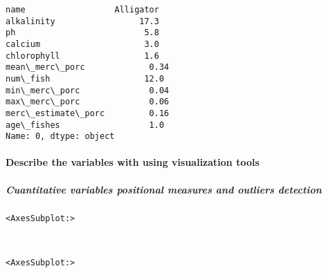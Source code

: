 \documentclass[11pt]{article}
\begin{document}
            \begin{tcolorbox}[breakable, size=fbox, boxrule=.5pt, pad at break*=1mm, opacityfill=0]
\begin{Verbatim}[commandchars=\\\{\}]
name                  Alligator
alkalinity                 17.3
ph                          5.8
calcium                     3.0
chlorophyll                 1.6
mean\_merc\_porc             0.34
num\_fish                   12.0
min\_merc\_porc              0.04
max\_merc\_porc              0.06
merc\_estimate\_porc         0.16
age\_fishes                  1.0
Name: 0, dtype: object
\end{Verbatim}
\end{tcolorbox}
        
    \hypertarget{describe-the-variables-with-using-visualization-tools}{%
\paragraph{Describe the variables with using visualization
tools}\label{describe-the-variables-with-using-visualization-tools}}

\hypertarget{cuantitative-variables-positional-measures-and-outliers-detection}{%
\subparagraph{Cuantitative variables positional measures and outliers
detection}\label{cuantitative-variables-positional-measures-and-outliers-detection}}

            \begin{tcolorbox}[breakable, size=fbox, boxrule=.5pt, pad at break*=1mm, opacityfill=0]
\begin{Verbatim}[commandchars=\\\{\}]
<AxesSubplot:>
\end{Verbatim}
\end{tcolorbox}
        
    \begin{center}
    \end{center}
    { \hspace*{\fill} \\}
    
            \begin{tcolorbox}[breakable, size=fbox, boxrule=.5pt, pad at break*=1mm, opacityfill=0]
\begin{Verbatim}[commandchars=\\\{\}]
<AxesSubplot:>
\end{Verbatim}
\end{tcolorbox}
        
\end{document}
